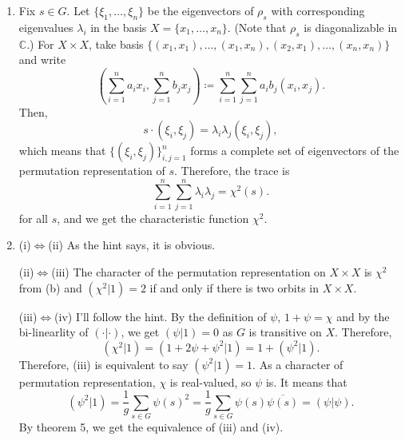 \documentclass[a4paper, 12pt]{article}
\theoremstyle{Mydefinition}
\theoremstyle{Mytheorem}
\begin{document}
\begin{enumerate}
    \item Fix $s\in G$. Let $\{\xi_1, \ldots, \xi_n\}$ be the eigenvectors of $\rho_s$ with corresponding eigenvalues $\lambda_i$ in the basis $X = \{x_1, \ldots, x_n\}$. (Note that $\rho_s$ is diagonalizable in $\mathbb{C}$.) For $X\times X$, take basis $\{(x_1, x_1), \ldots, (x_1, x_n), (x_2, x_1), \ldots, (x_n, x_n)\}$ and write
    \begin{equation}
        \left(\sum_{i=1}^n a_i x_i, \sum_{j=1}^n b_j x_j\right) \coloneqq \sum_{i=1}^n\sum_{j=1}^na_ib_j\left(x_i, x_j\right).
    \end{equation}
    Then,
    \begin{equation}
        s\cdot (\xi_i, \xi_j) = \lambda_i\lambda_j(\xi_i, \xi_j),
    \end{equation}
    which means that $\{(\xi_i, \xi_j)\}_{i,j=1}^n$ forms a complete set of eigenvectors of the permutation representation of $s$. Therefore, the trace is
    \begin{equation}
        \sum_{i=1}^n\sum_{j=1}^n \lambda_i\lambda_j = \chi^2(s).
    \end{equation}
    for all $s$, and we get the characteristic function $\chi^2$.
    
    \item (i)$\Leftrightarrow$(ii) As the hint says, it is obvious.
    
    (ii)$\Leftrightarrow$(iii) The character of the permutation representation on $X\times X$ is $\chi^2$ from (b) and $(\chi^2|1) = 2$ if and only if there is two orbits in $X\times X$.
    
    (iii)$\Leftrightarrow$(iv) I'll follow the hint. By the definition of $\psi$, $1+\psi = \chi$ and by the bi-linearlity of $(\cdot| \cdot)$, we get $(\psi|1) = 0$ as $G$ is transitive on $X$. Therefore,
    \begin{equation}
        (\chi^2|1) =(1+2\psi+\psi^2|1) = 1+(\psi^2|1).
    \end{equation}
    Therefore, (iii) is equivalent to say $(\psi^2|1) = 1$. As a character of permutation representation, $\chi$ is real-valued, so $\psi$ is. It means that
    \begin{equation}
        (\psi^2|1) = \frac{1}{g}\sum_{s\in G}\psi(s)^2 = \frac{1}{g}\sum_{s\in G}\psi(s)\overline{\psi(s)} = (\psi|\psi).
    \end{equation}
    By theorem 5, we get the equivalence of (iii) and (iv).
\end{enumerate}
\end{document}
